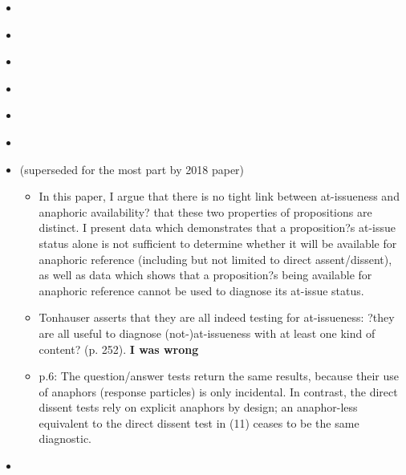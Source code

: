 \documentclass[11pt,fleqn]{article}
\newcommand{\6}{\mbox{$[\hspace*{-.6mm}[$}}
\newcommand{\9}{\mbox{$]\hspace*{-.6mm}]$}}
\begin{document}
\begin{itemize}
\begin{itemize}
\begin{itemize}
\end{itemize}

\end{itemize}

\item \citealt{amaral-etal2007}

\item \citealt{gutzmann}

\item \citealt{korotkova2020}

\item \citealt{murray2014}

\item \citealt{anderbois-etal2015}

\item \citealt{snider-thesis}

\item \citealt{snider2017} (superseded for the most part by 2018 paper)

\begin{itemize}

\item In this paper, I argue that there is no tight link between at-issueness and anaphoric availability? that these two properties of propositions are distinct. I present data which demonstrates that a proposition?s at-issue status alone is not sufficient to determine whether it will be available for anaphoric reference (including but not limited to direct assent/dissent), as well as data which shows that a proposition?s being available for anaphoric reference cannot be used to diagnose its at-issue status.

\item  Tonhauser asserts that they are all indeed testing for at-issueness: ?they are all useful to diagnose (not-)at-issueness with at least one kind of content? (p. 252). {\bf I was wrong}

\item p.6: The question/answer tests return the same results, because their use of anaphors (response particles) is only incidental. In contrast, the direct dissent tests rely on explicit anaphors by design; an anaphor-less equivalent to the direct dissent test in (11) ceases to be the same diagnostic.

\end{itemize}

\item \citealt{snider2018}

\begin{itemize}


\end{itemize}
\end{itemize}
\end{document}
